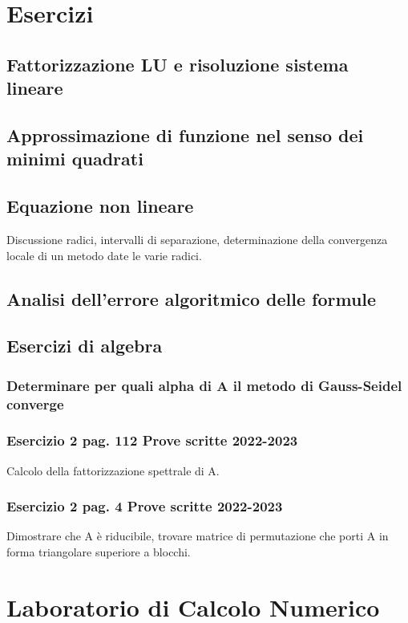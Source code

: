 \documentclass[12pt,a4paper,]{report}
\begin{document}
\chapter{Esercizi}

\begin{lezione}
    [Lezione 24 21/05]
\end{lezione}
 
\section{Fattorizzazione LU e risoluzione sistema lineare}
\section{Approssimazione di funzione nel senso dei minimi quadrati}
\section{Equazione non lineare}
Discussione radici, intervalli di separazione, determinazione della convergenza locale di un metodo date le varie radici.
\section{Analisi dell'errore algoritmico delle formule}
\section{Esercizi di algebra}
\subsection{Determinare per quali alpha di A il metodo di Gauss-Seidel converge}
\subsection{Esercizio 2 pag. 112 Prove scritte 2022-2023}
Calcolo della fattorizzazione spettrale di A.
\subsection{Esercizio 2 pag. 4 Prove scritte 2022-2023}
Dimostrare che A è riducibile, trovare matrice di permutazione che porti A in forma triangolare superiore a blocchi.

\chapter{Laboratorio di Calcolo Numerico}
\end{document}
